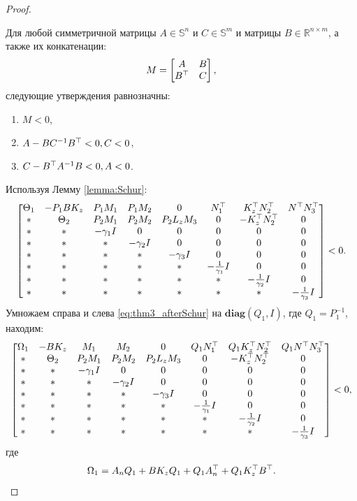\begin{proof}
\begin{lemma}
		Для любой симметричной матрицы ${A}\in \mathbb{S}^n$ и ${C}\in \mathbb{S}^m$ и матрицы ${B}\in \mathbb{R}^{n\times m}$, а также их конкатенации:
		\noindent \begin{align*}
			{M}= \begin{bmatrix}
				{A} & {B} \\
				{B}^\top & {C} 
			\end{bmatrix},
		\end{align*}
		следующие утверждения равнозначны:
		\noindent
		\begin{enumerate}
			\item ${M} < 0$,
			\item ${A}-{B}{C}^{-1}{B}^\top < 0 , {C}< 0$,
			\item ${C}-{B}^\top{A}^{-1}{B}< 0 , {A}< 0$.
		\end{enumerate}
	\end{lemma}
	
	Используя Лемму {\ref{lemma:Schur}}:
		\begin{equation}
		\label{eq:thm3_afterSchur}
		\begin{bmatrix}
			{\Theta}_1 & -{P}_1{B}{K}_z & {P}_1{M}_1 & {P}_1{M}_2 &0& {N}_1^\top & {K}_z^\top{N}_2^\top  & {N}^\top{N}_3^\top 
			\\
			* & {\Theta}_2 & {P}_2{M}_1 & {P}_2{M}_2 & {P}_2{L}_z{M}_3 & 0 & -{K}_z^\top{N}_2^\top & 0\\
			* & * & -\gamma_1{I} & 0&0&0&0&0\\
			* & * & * & -\gamma_2{I}&0&0&0&0\\
			* & * & * & *&-\gamma_3{I}&0&0&0\\
			* & * & * & *&*&-\frac{1}{\gamma_1}{I}&0&0\\
			* & * & * & *&*&*&-\frac{1}{\gamma_2}{I}&0\\
			*&* & * & * & *&*&*&-\frac{1}{\gamma_3}{I}
		\end{bmatrix}<0.
	\end{equation}
	Умножаем справа и слева \eqref{eq:thm3_afterSchur} на $\textbf{diag}({Q}_1, {I})$, где ${Q}_1 = {P}_1^{-1}$, находим:
	\begin{equation}
		\label{eq:thm3_before_Young}
		\begin{bmatrix}
			{\Omega}_1 & -{B}{K}_z & {M}_1 & {M}_2 & 0& {Q}_1{N}_1^\top & {Q}_1{K}_z^\top{N}_2^\top & {Q}_1 {N}^\top{N}_3^\top 
			\\
			* & {\Theta}_2 & {P}_2{M}_1 & {P}_2{M}_2 & {P}_2{L}_z{M}_3 & 0 & -{K}_z^\top{N}_2^\top & 0\\
			* & * & -\gamma_1{I} & 0&0&0&0&0\\
			* & * & * & -\gamma_2{I}&0&0&0&0\\
			* & * & * & *&-\gamma_3{I}&0&0&0\\
			* & * & * & *&*&-\frac{1}{\gamma_1}{I}&0&0\\
			* & * & * & *&*&*&-\frac{1}{\gamma_2}{I}&0\\
			*&* & * & * & *&*&*&-\frac{1}{\gamma_3}{I}
		\end{bmatrix}<0,
	\end{equation}
	где
	\begin{equation}
		{\Omega}_1={A}_n{Q}_1+{B}{K}_z{Q}_1+{Q}_1{A}_n^\top+{Q}_1{K}_z^\top{B}^\top.
	\end{equation}


\end{proof}
